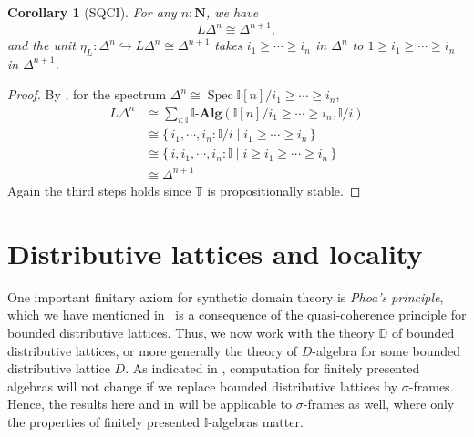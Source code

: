 \documentclass[a4paper,12pt]{amsart}
\newtheorem{corollary}[theorem]{Corollary}
\theoremstyle{definition}
\newcommand{\mb}[1]{\mathbf{#1}}
\newcommand{\mbb}[1]{\mathbb{#1}}
\newcommand{\T}{\mbb T}
\newcommand{\I}{\mbb I}
\newcommand{\alg}{\text{-}\mb{Alg}}
\newcommand{\scomp}[2]{\{\,#1\mid#2\,\}}
\newcommand{\hook}{\hookrightarrow}
\newcommand{\N}{\mb N}
\newcommand{\spec}{\operatorname{Spec}}
\begin{document}


\begin{corollary}[SQCI]
  For any $n : \N$, we have
  \[ L\Delta^n \cong \Delta^{n+1}, \]
  and the unit $\eta_L \colon \Delta^n \hook L\Delta^n \cong \Delta^{n+1}$ takes $i_1 \ge \cdots \ge i_n$ in $\Delta^n$ to $1 \ge i_1 \ge \cdots \ge i_n$ in $\Delta^{n+1}$. 
\end{corollary}
\begin{proof}
  By , for the spectrum $\Delta^n \cong \spec\I[n]/i_1 \ge \cdots \ge i_n$,
  \begin{align*}
    L\Delta^n
    &\cong \sum_{i:\I}\I\alg(\I[n]/i_1\ge\cdots\ge i_n,\I/i) \\
    &\cong \scomp{i_1,\cdots,i_n:\I/i}{i_1 \ge \cdots \ge i_n} \\
    &\cong \scomp{i,i_1,\cdots,i_n:\I}{i \ge i_1 \ge \cdots \ge i_n} \\
    &\cong \Delta^{n+1}
  \end{align*}
  Again the third steps holds since $\T$ is propositionally stable.
\end{proof}

\section{Distributive lattices and locality}\label{sec:locality}

One important finitary axiom for synthetic domain theory is \emph{Phoa's principle}, which we have mentioned in~ is a consequence of the quasi-coherence principle for bounded distributive lattices. 
Thus, we now work with the theory $\mbb D$ of bounded distributive lattices, or more generally the theory of $D$-algebra for some bounded distributive lattice $D$. As indicated in , computation for finitely presented algebras 
will not change if we replace bounded distributive lattices by $\sigma$-frames. Hence, the results here and in  will be applicable to $\sigma$-frames as well, where only the properties of finitely presented $\I$-algebras matter.
\end{document}

